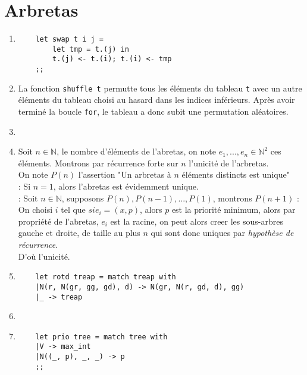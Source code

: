 \documentclass{article}
\newcommand{\bb}[1]{\mathbb{#1}}
\newcommand{\image}[3]{ %
    \begin{minipage}[t]{\linewidth}
        #1
              \adjustbox{valign=t}{%
                \texttt{[image: \#3]}%
              }
    \end{minipage}}
\begin{document}
\section{Arbretas}

\begin{enumerate}

\item \begin{verbatim}
    let swap t i j =
        let tmp = t.(j) in
        t.(j) <- t.(i); t.(i) <- tmp
    ;;
\end{verbatim}

\item La fonction \texttt{shuffle t} permutte tous les éléments du tableau \texttt{t} avec un autre éléments du tableau
choisi au hasard dans les indices inférieurs. Après avoir terminé la boucle \texttt{for}, le tableau a donc subit une permutation
aléatoires.

\item \image{\raggedright}{0.25}{drawing/III_3.pdf}

\item Soit $n \in \bb{N}$, le nombre d'éléments de l'abretas, on note $e_1, ..., e_n \in \bb{N}^2$ ces éléments.
Montrons par récurrence forte sur $n$ l'unicité de l'arbretas. \\
On note $P(n)$ l'assertion "Un arbretas à $n$ éléments distincts est unique" \\
 : Si $n = 1$, alors l'abretas est évidemment unique. \\
 : Soit $n \in \bb{N}$, supposons $P(n), P(n-1), ..., P(1)$, montrons $P(n+1)$ :
On choisi $i$ tel que $si e_i = (x, p)$, alors $p$ est la priorité minimum, alors par propriété de l'abretas, $e_i$ est la racine,
on peut alors creer les sous-arbres gauche et droite, de taille au plus $n$ qui sont donc uniques par {\it hypothèse de récurrence}. \\
D'où l'unicité. 

\item \begin{verbatim}
    let rotd treap = match treap with
    |N(r, N(gr, gg, gd), d) -> N(gr, N(r, gd, d), gg)
    |_ -> treap
\end{verbatim}


\item \image{\raggedright}{}{drawing/III_6.pdf}

\item \begin{verbatim}
    let prio tree = match tree with
    |V -> max_int
    |N((_, p), _, _) -> p
    ;;
\end{verbatim}


\end{enumerate}
\end{document}
